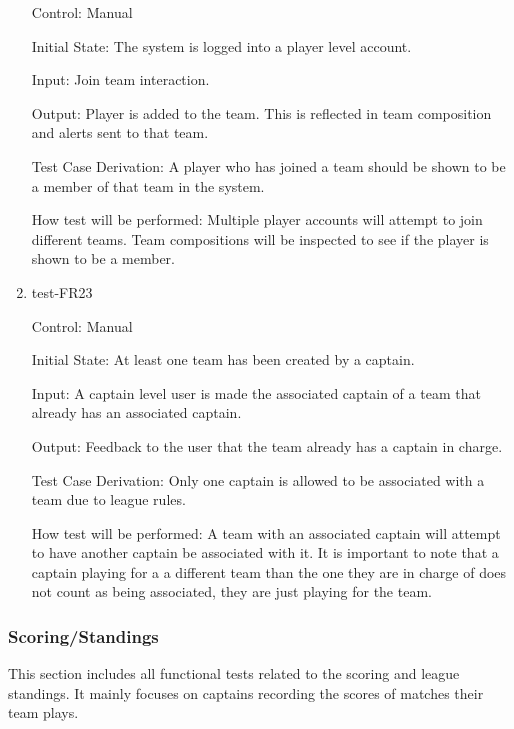 \documentclass[12pt, titlepage]{article}
\begin{document}
\begin{enumerate}
  Control: Manual

  Initial State: The system is logged into a player level account.

  Input: Join team interaction.

  Output: Player is added to the team. This is reflected in team composition
  and alerts sent to that team.

  Test Case Derivation: A player who has joined a team should be shown to be a
  member of that team in the system.

  How test will be performed: Multiple player accounts will attempt to join 
  different teams. Team compositions will be inspected to see if the player
  is shown to be a member. 

  \item{test-FR23\\}

  Control: Manual

  Initial State: At least one team has been created by a captain.

  Input: A captain level user is made the associated captain of a team that
  already has an associated captain.

  Output: Feedback to the user that the team already has a captain in charge.

  Test Case Derivation: Only one captain is allowed to be associated with a
  team due to league rules.

  How test will be performed: A team with an associated captain will attempt
  to have another captain be associated with it. It is important to note that
  a captain playing for a a different team than the one they are in charge of
  does not count as being associated, they are just playing for the team.

\end{enumerate}

\subsubsection{Scoring/Standings}

This section includes all functional tests related to the scoring and
league standings. It mainly focuses on captains recording the scores of
matches their team plays.
\end{document}
